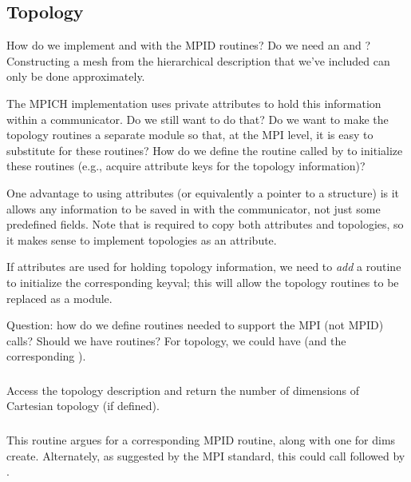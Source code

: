 \documentclass{article}
\begin{document}
\subsection{Topology}

How do we implement  and 
with the MPID routines?   
Do we need an  and
?  Constructing a mesh from the 
hierarchical description that we've included can only be done
approximately.

The MPICH implementation uses private attributes to hold this information 
within a communicator.  Do we still want to do that?  Do we want to make the
topology routines a separate module so that, at the MPI level, it is easy to
substitute for these routines?  How do we define the routine called by
 to initialize these routines (e.g., acquire attribute keys
for the topology information)?

One advantage to using attributes (or equivalently a pointer to a
structure) is it allows any information to be saved in with the
communicator, not just some predefined fields.  Note that
 is required to copy both attributes and
topologies, so it makes sense to implement topologies as an attribute.

If attributes are used for holding topology information, we need to
\emph{add} a routine to initialize the corresponding keyval; this will
allow the topology routines to be replaced as a module.

Question: how do we define routines needed to support the MPI (not
MPID) calls?  Should we have  routines?  For topology, we
could have  (and the corresponding
). 

\subsubsection{}
Access the topology description and return the number of dimensions of
Cartesian topology (if defined).

\subsubsection{}
This routine argues for a corresponding MPID routine, along with one for dims
create. Alternately, as suggested by the MPI standard, this could call
 followed by .
\end{document}

